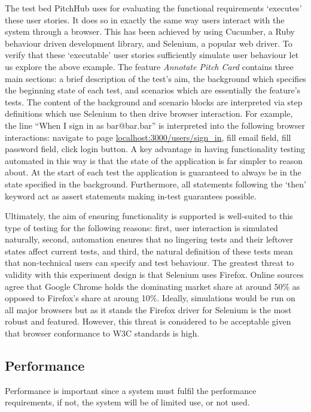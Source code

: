 The test bed PitchHub uses for evaluating the functional requirements `executes' these user stories. It does so in exactly the same way users interact with the system through a browser. This has been achieved by using Cucumber, a Ruby behaviour driven development library, and Selenium, a popular web driver. To verify that these `executable' user stories sufficiently simulate user behaviour let us explore the above example. The feature \textit{Annotate Pitch Card} contains three main sections: a brief description of the test's aim, the background which specifies the beginning state of each test, and scenarios which are essentially the feature's tests. The content of the background and scenario blocks are interpreted via step definitions which use Selenium to then drive browser interaction. For example, the line ``When I sign in as bar@bar.bar'' is interpreted into the following browser interactions: navigate to page \url{localhost:3000/users/sign_in}, fill email field, fill password field, click login button.
A key advantage in having functionality testing automated in this way is that the state of the application is far simpler to reason about. At the start of each test the application is guaranteed to always be in the state specified in the background. Furthermore, all statements following the `then' keyword act as assert statements making in-test guarantees possible.

Ultimately, the aim of ensuring functionality is supported is well-suited to this type of testing for the following reasons: first, user interaction is simulated naturally, second, automation ensures that no lingering tests and their leftover states affect current tests, and third, the natural definition of these tests mean that non-technical users can specify and test behaviour. The greatest threat to validity with this experiment design is that Selenium uses Firefox. Online sources agree that Google Chrome holds the dominating market share at around 50\% as opposed to Firefox's share at aroung 10\%. Ideally, simulations would be run on all major browsers but as it stands the Firefox driver for Selenium is the most robust and featured. However, this threat is considered to be acceptable given that browser conformance to W3C standards is high.

\subsection{Performance}\label{SS:performance}

Performance is important since a system must fulfil the performance requirements, if not, the system will be of limited use, or not used.